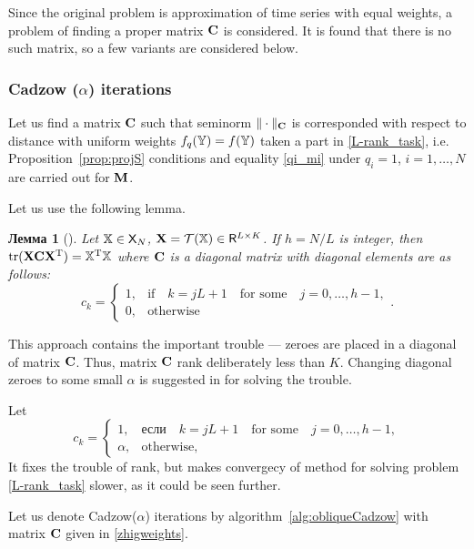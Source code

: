 \documentclass[12pt,a4paper,fleqn,leqno]{article}
\DeclareMathOperator{\tr}{tr}
\newtheorem{lemma}{Лемма}
\begin{document}
Since the original problem is approximation of time series with equal weights, a problem of finding a proper matrix $\mathbf{C}$ is considered.
It is found that there is no such matrix, so a few variants are considered below.

\subsubsection{Cadzow ($\alpha$) iterations}
\label{sec:cadzow_alpha}
Let us find a matrix $\mathbf{C}$ such that seminorm $\|\cdot\|_{\mathbf{C}}$ is corresponded with respect to distance with uniform weights $f_q(\mathbb{Y}) = f(\mathbb{Y})$ taken a part in \eqref{L-rank_task}, i.e. Proposition~\ref{prop:projS} conditions and equality \eqref{qi_mi} under $q_i = 1$, $i=1,\ldots,N$ are carried out for $\mathbf{M}$.

Let us use the following lemma.

\begin{lemma}[\cite{Gillard2014}]
\label{zhiglemma}
Let $\mathbb{X} \in \mathsf{X}_N$, $\mathbf{X} = \mathcal{T}(\mathbb{X}) \in \mathsf{R}^{L \times K}$. If $h = N/L$ is integer, then $\tr(\bfX \bfC \bfX^\rmT) = \tsX^\rmT \tsX$ where $\mathbf{C}$ is a diagonal matrix with diagonal elements are as follows:
\begin{equation*}
c_k = \begin{cases}
1, & \text{if} \quad k = jL+1 \quad \text{for some} \quad j = 0, \ldots, h-1, \\
0, & \text{otherwise}
\end{cases}.
\end{equation*}
\end{lemma}

This approach contains the important trouble --- zeroes are placed in a diagonal of matrix $\mathbf{C}$. Thus, matrix $\mathbf{C}$ rank deliberately less than $K$. Changing diagonal zeroes to some small $\alpha$ is suggested in \cite{Gillard2014} for solving the trouble.

Let
\begin{equation}\label{zhigweights}
c_k = \begin{cases}
1, & \text{если} \quad k = jL+1 \quad \text{for some} \quad j = 0, \ldots, h-1, \\
\alpha, & \text{otherwise,}
\end{cases}
\end{equation}
It fixes the trouble of rank, but makes convergecy of method for solving problem \eqref{L-rank_task} slower, as it could be seen further.

Let us denote Cadzow($\alpha$) iterations by algorithm~\ref{alg:obliqueCadzow} with matrix $\mathbf{C}$  given in \eqref{zhigweights}.
\end{document}
